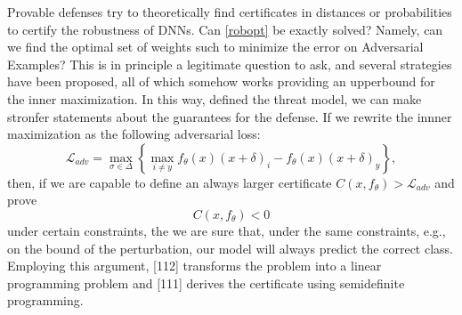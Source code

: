 \documentclass[LaM,binding=0.6cm]{./packages/sapthesis/sapthesis}
\begin{document}
            \label{provrob}
            Provable defenses try to theoretically find certificates in distances or probabilities to certify the robustness of DNNs.
            Can \ref{robopt} be exactly solved? Namely, can we find the optimal set of weights such to minimize 
            the error on Adversarial Examples? This is in principle a legitimate question to ask, and several 
            strategies have been proposed, all of which somehow works providing an upperbound for the inner maximization.
            In this way, defined the threat model, we can make stronfer statements about the guarantees for the defense.
            If we rewrite the innner maximization as the following adversarial loss:
            \begin{equation}
                \mathcal{L}_{a d v}=\max _{\sigma \in \Delta}\left\{\max _{i \neq y} f_{\theta}(x)\left(x + \delta\right)_{i}-f_{\theta}(x)\left(x + \delta\right)_{y}\right\},
            \end{equation}
            then, if we are capable to define an always larger certificate $ C(x, f_{\theta}) > \mathcal{L}_{a d v}$ and prove
            \begin{equation}
                C(x, f_{\theta}) < 0
            \end{equation}
            under certain constraints, the we are sure that, under the same constraints, e.g., on the bound of 
            the perturbation, our model will always predict the correct class. Employing this argument,
            [112] transforms the problem into a linear programming problem and [111] derives the certificate using
            semidefinite programming.
            
\end{document}
